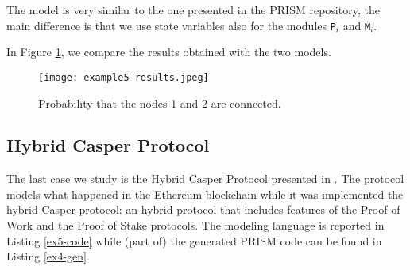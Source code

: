 The model is very similar to the one presented in the PRISM repository, the main difference is that we use state variables also for the modules \texttt{P$_i$} and \texttt{M$_i$}.
 
In Figure \ref{ex4-res}, we compare the results obtained with the two models.
\begin{figure}[h]
\centering
\texttt{[image: example5-results.jpeg]}	
\caption{Probability that the nodes 1 and 2 are connected.}
\label{ex4-res}
\end{figure}


\subsection{Hybrid Casper Protocol}
The last case we study is the Hybrid Casper Protocol presented in \cite{DBLP:journals/distribledger/GallettaLMV23}. 
The protocol models what happened in the Ethereum blockchain while it was implemented the hybrid Casper protocol:
an hybrid protocol that includes features of the Proof of Work and the Proof of Stake protocols.
The modeling language is reported in Listing \ref{ex5-code} while (part of) the generated PRISM code can be found in Listing \ref{ex4-gen}.
